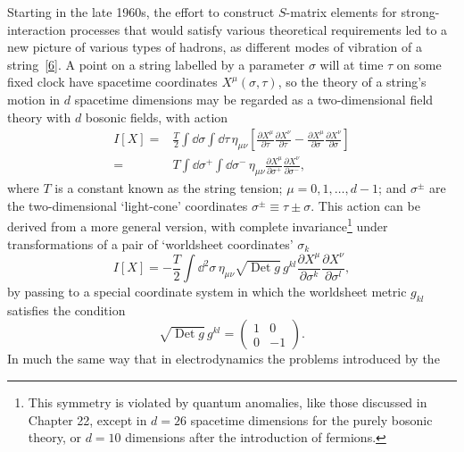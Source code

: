 Starting in the late 1960s, the effort to construct \(S\)-matrix elements for
strong-\allowbreak interaction processes that would satisfy various theoretical
requirements led to a new picture of various types of hadrons, as different
modes of vibration of a string~\hyperref[ch24-ref-6]{[6]}. A point on a string
labelled by a parameter \(\sigma\) will at time \(\tau\) on some fixed clock
have spacetime coordinates \(X^\mu(\sigma,\tau)\), so the theory of a string's
motion in \(d\) spacetime dimensions may be regarded as a two-dimensional
field theory with \(d\) bosonic fields, with action
\begin{equation}
\begin{aligned}
I[X]
={}&\frac{T}{2}\int \dd\sigma\int \dd\tau\,\eta_{\mu\nu}
\left[
\frac{\partial X^\mu}{\partial\tau}
\frac{\partial X^\nu}{\partial\tau}
-
\frac{\partial X^\mu}{\partial\sigma}
\frac{\partial X^\nu}{\partial\sigma}
\right]
\\
={}&T\int \dd\sigma^+\int \dd\sigma^-\,\eta_{\mu\nu}
\frac{\partial X^\mu}{\partial\sigma^+}
\frac{\partial X^\nu}{\partial\sigma^-},
\end{aligned}
\tag{24.2.1}\label{eq:24.2.1}
\end{equation}
where \(T\) is a constant known as the string tension;
\(\mu=0,1,\ldots,d-1\); and \(\sigma^\pm\) are the two-dimensional
`light-cone' coordinates \(\sigma^\pm\equiv\tau\pm\sigma\). This action can be
derived from a more general version, with complete invariance\footnote{This
symmetry is violated by quantum anomalies, like those discussed in Chapter
22, except in \(d=26\) spacetime dimensions for the purely bosonic theory, or
\(d=10\) dimensions after the introduction of fermions.} under transformations
of a pair of `worldsheet coordinates' \(\sigma_k\)
\begin{equation}
I[X]=-\frac{T}{2}\int \dd^2\sigma\,\eta_{\mu\nu}
\sqrt{\operatorname{Det}g}\,g^{kl}
\frac{\partial X^\mu}{\partial\sigma^k}
\frac{\partial X^\nu}{\partial\sigma^l},
\tag{24.2.2}\label{eq:24.2.2}
\end{equation}
by passing to a special coordinate system in which the worldsheet metric
\(g_{kl}\) satisfies the condition
\begin{equation}
\sqrt{\operatorname{Det}g}\,g^{kl}
=
\begin{pmatrix}
1 & 0\\
0 & -1
\end{pmatrix}.
\tag{24.2.3}\label{eq:24.2.3}
\end{equation}
In much the same way that in electrodynamics the problems introduced by the
